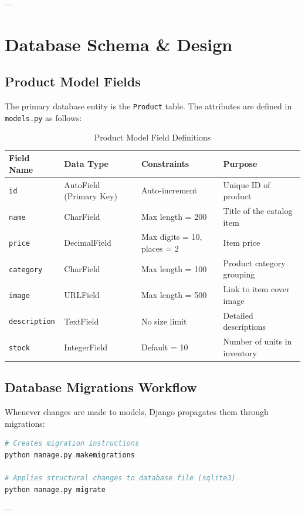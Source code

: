 \documentclass[12pt,a4paper]{report}
\begin{document}
---

\chapter{Database Schema \& Design}

\section{Product Model Fields}
The primary database entity is the \texttt{Product} table. The attributes are defined in \texttt{models.py} as follows:

\begin{table}[h]
\centering
\begin{tabular}{llll}
\toprule
\textbf{Field Name} & \textbf{Data Type} & \textbf{Constraints} & \textbf{Purpose} \\ \midrule
\texttt{id} & AutoField (Primary Key) & Auto-increment & Unique ID of product \\
\texttt{name} & CharField & Max length = 200 & Title of the catalog item \\
\texttt{price} & DecimalField & Max digits = 10, places = 2 & Item price \\
\texttt{category} & CharField & Max length = 100 & Product category grouping \\
\texttt{image} & URLField & Max length = 500 & Link to item cover image \\
\texttt{description} & TextField & No size limit & Detailed descriptions \\
\texttt{stock} & IntegerField & Default = 10 & Number of units in inventory \\
\bottomrule
\end{tabular}
\caption{Product Model Field Definitions}
\label{tab:product_model}
\end{table}

\section{Database Migrations Workflow}
Whenever changes are made to models, Django propagates them through migrations:
\begin{lstlisting}[language=bash]
# Creates migration instructions
python manage.py makemigrations

# Applies structural changes to database file (sqlite3)
python manage.py migrate
\end{lstlisting}

---
\end{document}
